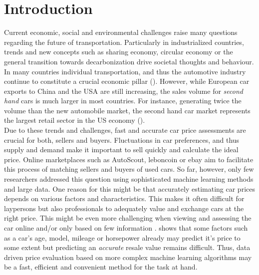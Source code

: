 \documentclass[12pt]{article}
\begin{document}
\newpage


\section{Introduction}
Current economic, social and environmental challenges raise many questions regarding the future of transportation. Particularly in industrialized countries, trends and new concepts such as sharing economy, circular economy or the general transition towards decarbonization drive societal thoughts and behaviour. In many countries individual transportation, and thus the automotive industry continue to constitute a crucial economic pillar (\cite{huang2023dvmcar}). However, while European car exports to China and the USA are still increasing, the sales volume for \textit{second hand} cars is much larger in most countries. For instance, generating twice the volume than the new automobile market, the second hand car market represents the largest retail sector in the US economy (\cite{Celik2019}). \\


\noindent Due to these trends and challenges, fast and accurate car price assessments are crucial for both, sellers and buyers. Fluctuations in car preferences, and thus supply and demand make it important to sell quickly and calculate the ideal price. Online marketplaces such as AutoScout, leboncoin or ebay aim to facilitate this process of matching sellers and buyers of used cars. So far, however, only few researchers addressed this question using sophisticated machine learning methods and large data. One reason for this might be that accurately estimating car prices depends on various factors and characteristics. This makes it often difficult for laypersons but also professionals to adequately value and exchange cars at the right price. This might be even more challenging when viewing and assessing the car online and/or only based on few information \cite{Bilen2021}. \cite{Pudaruth2014} shows that some factors such as a car's age, model, mileage or horsepower already may predict it's price to some extent but predicting an \textit{accurate} resale value remains difficult. Thus, data driven price evaluation based on more complex machine learning algorithms may be a fast, efficient and convenient method for the task at hand.\\
\end{document}
